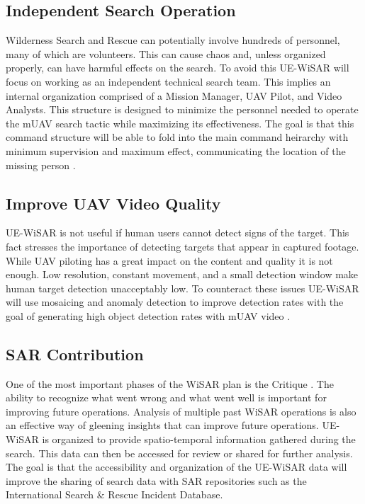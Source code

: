 \documentclass[12pt]{IEEEtran}
\begin{document}
\subsection{Independent Search Operation}
Wilderness Search and Rescue can potentially involve hundreds of personnel, many
of which are volunteers.  This can cause chaos and, unless organized properly,
can have harmful effects on the search.  To avoid this UE-WiSAR will focus on
working as an independent technical search team.  This implies an internal
organization comprised of a Mission Manager, UAV Pilot, and Video Analysts. 
This structure is designed to minimize the personnel needed to operate the mUAV
search tactic while maximizing its effectiveness.  The goal is that this command
structure will be able to fold into the main command heirarchy with minimum
supervision and maximum effect, communicating the location of the missing
person \cite{goodrich2008supporting}.

\subsection{Improve UAV Video Quality}
UE-WiSAR is not useful if human users cannot detect signs of the target.  This
fact stresses the importance of detecting targets that appear in captured
footage. While UAV piloting has a great impact on the content and quality it
is not enough.  Low resolution, constant movement, and a small detection window
make human target detection unacceptably low.  To counteract these issues
UE-WiSAR will use mosaicing and anomaly detection to improve detection
rates with the goal of generating high object detection rates with mUAV video
\cite{thornton2011detection, morse2008application}.

\subsection{SAR Contribution}
One of the most important phases of the WiSAR plan is the
Critique \cite{setnicka1980}.  The ability to recognize what went wrong and what
went well is important for improving future operations.  Analysis of multiple
past WiSAR operations is also an effective way of gleening insights that can
improve future operations.  UE-WiSAR is organized to provide spatio-temporal
information gathered during the search.  This data can then be accessed for
review or shared for further analysis.  The goal is that the accessibility and
organization of the UE-WiSAR data will improve the sharing of search data with
SAR repositories such as the International Search \& Rescue Incident Database.
\end{document}
